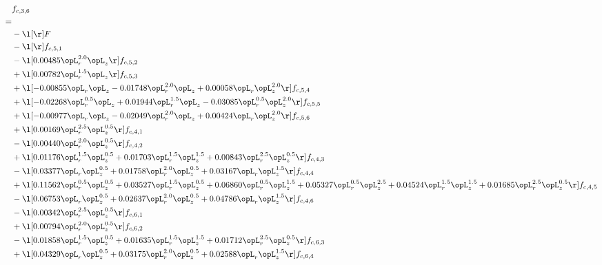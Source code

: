 \begin{alignat}{2} 
\label{eq:f_36_2} 
& f_{c,3,6} \nonumber \\ 
 = \\ 
& - \l[  \r] F \nonumber \\ 
& - \l[  \r] f_{c,5,1} \nonumber \\ 
& - \l[  0.00485 \opL_r^{2.0} \opL_z  \r] f_{c,5,2} \nonumber \\ 
& + \l[  0.00782 \opL_r^{1.5} \opL_z  \r] f_{c,5,3} \nonumber \\ 
& + \l[  -0.00855 \opL_r \opL_z   -0.01748 \opL_r^{2.0} \opL_z +  0.00058 \opL_r \opL_z^{2.0}  \r] f_{c,5,4} \nonumber \\ 
& + \l[  -0.02268 \opL_r^{0.5} \opL_z +  0.01944 \opL_r^{1.5} \opL_z   -0.03085 \opL_r^{0.5} \opL_z^{2.0}  \r] f_{c,5,5} \nonumber \\ 
& + \l[  -0.00977 \opL_r \opL_z   -0.02049 \opL_r^{2.0} \opL_z +  0.00424 \opL_r \opL_z^{2.0}  \r] f_{c,5,6} \nonumber \\ 
& + \l[  0.00169 \opL_r^{2.5} \opL_z^{0.5}  \r] f_{c,4,1} \nonumber \\ 
& - \l[  0.00440 \opL_r^{2.0} \opL_z^{0.5}  \r] f_{c,4,2} \nonumber \\ 
& + \l[  0.01176 \opL_r^{1.5} \opL_z^{0.5} +  0.01703 \opL_r^{1.5} \opL_z^{1.5} +  0.00843 \opL_r^{2.5} \opL_z^{0.5}  \r] f_{c,4,3} \nonumber \\ 
& - \l[  0.03377 \opL_r \opL_z^{0.5} +  0.01758 \opL_r^{2.0} \opL_z^{0.5} +  0.03167 \opL_r \opL_z^{1.5}  \r] f_{c,4,4} \nonumber \\ 
& + \l[  0.11562 \opL_r^{0.5} \opL_z^{0.5} +  0.03527 \opL_r^{1.5} \opL_z^{0.5} +  0.06860 \opL_r^{0.5} \opL_z^{1.5} +  0.05327 \opL_r^{0.5} \opL_z^{2.5} +  0.04524 \opL_r^{1.5} \opL_z^{1.5} +  0.01685 \opL_r^{2.5} \opL_z^{0.5}  \r] f_{c,4,5} \nonumber \\ 
& - \l[  0.06753 \opL_r \opL_z^{0.5} +  0.02637 \opL_r^{2.0} \opL_z^{0.5} +  0.04786 \opL_r \opL_z^{1.5}  \r] f_{c,4,6} \nonumber \\ 
& - \l[  0.00342 \opL_r^{2.5} \opL_z^{0.5}  \r] f_{c,6,1} \nonumber \\ 
& + \l[  0.00794 \opL_r^{2.0} \opL_z^{0.5}  \r] f_{c,6,2} \nonumber \\ 
& - \l[  0.01858 \opL_r^{1.5} \opL_z^{0.5} +  0.01635 \opL_r^{1.5} \opL_z^{1.5} +  0.01712 \opL_r^{2.5} \opL_z^{0.5}  \r] f_{c,6,3} \nonumber \\ 
& + \l[  0.04329 \opL_r \opL_z^{0.5} +  0.03175 \opL_r^{2.0} \opL_z^{0.5} +  0.02588 \opL_r \opL_z^{1.5}  \r] f_{c,6,4} \nonumber \\ 

\end{alignat}
